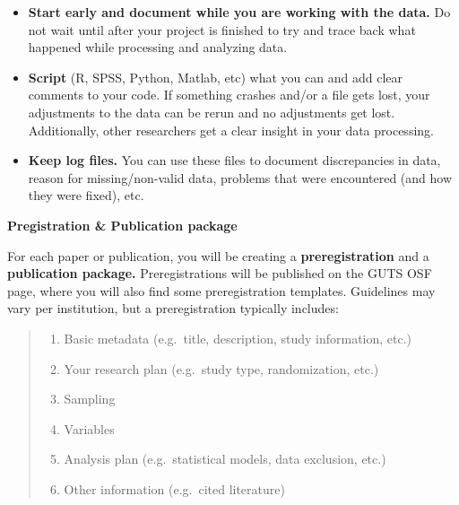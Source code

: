 \documentclass[
  letterpaper,
  DIV=11,
  numbers=noendperiod]{scrreprt}
\begin{document}
\begin{tcolorbox}[enhanced jigsaw, arc=.35mm, left=2mm, colbacktitle=quarto-callout-tip-color!10!white, bottomtitle=1mm, toptitle=1mm, titlerule=0mm, leftrule=.75mm, breakable, colframe=quarto-callout-tip-color-frame, colback=white, opacitybacktitle=0.6, coltitle=black, opacityback=0, rightrule=.15mm, toprule=.15mm, bottomrule=.15mm, title=\textcolor{quarto-callout-tip-color}{\faLightbulb}\hspace{0.5em}{Some tips}]

\begin{itemize}
\item
  \textbf{Start early and document while you are working with the data.}
  Do not wait until after your project is finished to try and trace back
  what happened while processing and analyzing data.
\item
  \textbf{Script} (R, SPSS, Python, Matlab, etc) what you can and add
  clear comments to your code. If something crashes and/or a file gets
  lost, your adjustments to the data can be rerun and no adjustments get
  lost. Additionally, other researchers get a clear insight in your data
  processing.
\item
  \textbf{Keep log files.} You can use these files to document
  discrepancies in data, reason for missing/non-valid data, problems
  that were encountered (and how they were fixed), etc.
\end{itemize}

\end{tcolorbox}

\textbf{Pregistration \& Publication package}

For each paper or publication, you will be creating a
\textbf{preregistration} and a \textbf{publication package.}
Preregistrations will be published on the GUTS OSF page, where you will
also find some preregistration templates. Guidelines may vary per
institution, but a preregistration typically includes:

\label{documentation-list-1}
\begin{quote}
\begin{enumerate}
\def\labelenumi{\arabic{enumi}.}
\item
  Basic metadata (e.g.~title, description, study information, etc.)
\item
  Your research plan (e.g.~study type, randomization, etc.)
\item
  Sampling
\item
  Variables
\item
  Analysis plan (e.g.~statistical models, data exclusion, etc.)
\item
  Other information (e.g.~cited literature)
\end{enumerate}
\end{quote}
\end{document}
